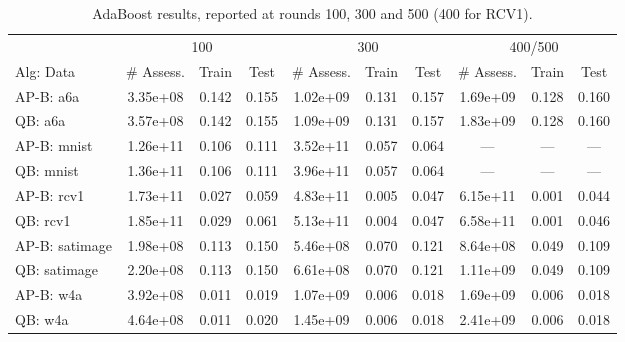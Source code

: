 \begin{table*}[ht]
\caption{AdaBoost results,
reported at rounds 100, 300 and 500 (400 for RCV1).}
\label{tbl:AdaBoostTestTrainErrors}
\vskip 0.15in
\begin{center}
\begin{small}
\begin{sc}
\begin{tabular}{lccccccccc}
\toprule
	& \multicolumn{3}{c}{100}
	& \multicolumn{3}{c}{300}
	& \multicolumn{3}{c}{400/500}
	\\
Alg: Data & \# Assess. & Train & Test & \# Assess. & Train & Test & \# Assess. & Train & Test \\
\midrule
AP-B: a6a & 3.35e+08 & 0.142 & 0.155 & 1.02e+09 & 0.131 & 0.157 & 1.69e+09 & 0.128 & 0.160 \\
QB: a6a & 3.57e+08 & 0.142 & 0.155 & 1.09e+09 & 0.131 & 0.157 & 1.83e+09 & 0.128 & 0.160 \\
AP-B: mnist & 1.26e+11 & 0.106 & 0.111 & 3.52e+11 & 0.057 & 0.064 & --- & --- & --- \\
QB: mnist & 1.36e+11 & 0.106 & 0.111 & 3.96e+11 & 0.057 & 0.064 & --- & --- & --- \\
AP-B: rcv1 & 1.73e+11 & 0.027 & 0.059 & 4.83e+11 & 0.005 & 0.047 & 6.15e+11 & 0.001 & 0.044 \\
QB: rcv1 & 1.85e+11 & 0.029 & 0.061 & 5.13e+11 & 0.004 & 0.047 & 6.58e+11 & 0.001 & 0.046 \\
AP-B: satimage & 1.98e+08 & 0.113 & 0.150 & 5.46e+08 & 0.070 & 0.121 & 8.64e+08 & 0.049 & 0.109 \\
QB: satimage & 2.20e+08 & 0.113 & 0.150 & 6.61e+08 & 0.070 & 0.121 & 1.11e+09 & 0.049 & 0.109 \\
AP-B: w4a & 3.92e+08 & 0.011 & 0.019 & 1.07e+09 & 0.006 & 0.018 & 1.69e+09 & 0.006 & 0.018 \\
QB: w4a & 4.64e+08 & 0.011 & 0.020 & 1.45e+09 & 0.006 & 0.018 & 2.41e+09 & 0.006 & 0.018 \\
\bottomrule
\end{tabular}
\end{sc}
\end{small}
\end{center}
\vskip -0.1in
\end{table*}
